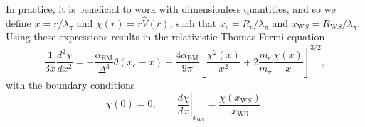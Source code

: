 In practice, it is beneficial to work with dimensionless quantities, and so we define $x = r/\lambda_\pi$ and $\chi(r) = r\hat{V}(r)$, such that $x_c = R_c/\lambda_\pi$ and $x_{\mathrm WS} = R_{\mathrm WS}/\lambda_\pi$.
Using these expressions results in the relativistic Thomas-Fermi equation
\begin{equation}
    \frac{1}{3x}\frac{d^2\chi}{dx^2} = -\frac{\alpha_{\mathrm{EM}}}{\Delta^3}\theta(x_c -x) + \frac{4\alpha_\mathrm{EM}}{9\pi}\left[ \frac{\chi^2(x)}{x^2} + 2\frac{m_e}{m_\pi}\frac{\chi(x)}{x}\right]^{3/2},\label{eq:FMT_DE}
\end{equation}
with the boundary conditions
\begin{equation}
    \chi(0) = 0, \qquad
    \left. \frac{d\chi}{dx}\right|_{x_{\mathrm{WS}}} = \frac{\chi(x_{\mathrm WS})}{x_{\mathrm{WS}}}. \label{eq:TF_bc}
\end{equation}

